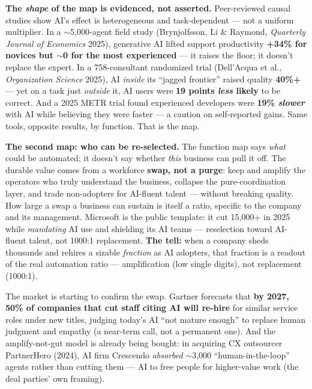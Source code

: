 \documentclass[11pt]{article}
\begin{document}
\begin{callout}
\textbf{The \emph{shape} of the map is evidenced, not asserted.} Peer-reviewed causal studies show
AI's effect is heterogeneous and task-dependent --- not a uniform multiplier. In a
$\sim$5{,}000-agent field study (Brynjolfsson, Li \& Raymond, \emph{Quarterly Journal of Economics}
2025), generative AI lifted support productivity \textbf{+34\% for novices but $\sim$0 for the
most experienced} --- it raises the floor; it doesn't replace the expert. In a 758-consultant
randomized trial (Dell'Acqua et al., \emph{Organization Science} 2025), AI \emph{inside} its
``jagged frontier'' raised quality \textbf{40\%+} --- yet on a task just \emph{outside} it, AI users
were \textbf{19 points \emph{less} likely} to be correct. And a 2025 METR trial found experienced
developers were \textbf{19\% \emph{slower}} with AI while believing they were faster --- a caution
on self-reported gains. Same tools, opposite results, by function. That is the map.
\end{callout}

\textbf{The second map: who can be re-selected.} The function map says \emph{what} could be
automated; it doesn't say whether \emph{this} business can pull it off. The durable value comes
from a workforce \textbf{swap, not a purge}: keep and amplify the operators who truly understand
the business, collapse the pure-coordination layer, and trade non-adopters for AI-fluent talent
--- without breaking quality. How large a swap a business can sustain is itself a ratio, specific
to the company and its management. Microsoft is the public template: it cut 15{,}000+ in 2025
while \emph{mandating} AI use and shielding its AI teams --- reselection toward AI-fluent talent,
not 1000:1 replacement. \textbf{The tell:} when a company sheds thousands and rehires a sizable
\emph{fraction} as AI adopters, that fraction is a readout of the real automation ratio ---
amplification (low single digits), not replacement (1000:1).

The market is starting to confirm the swap. Gartner forecasts that \textbf{by 2027, 50\% of
companies that cut staff citing AI will re-hire} for similar service roles under new titles, judging
today's AI ``not mature enough'' to replace human judgment and empathy (a near-term call, not a
permanent one). And the amplify-not-gut model is already being bought: in acquiring CX outsourcer
PartnerHero (2024), AI firm Crescendo \emph{absorbed} $\sim$3{,}000 ``human-in-the-loop'' agents
rather than cutting them --- AI to free people for higher-value work (the deal parties' own framing).
\end{document}
